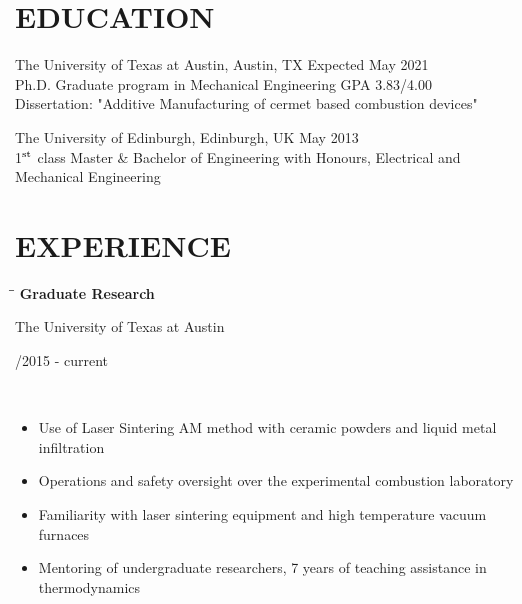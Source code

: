 \documentclass[11pt]{res}
\begin{document}
                                  
\begin{resume}

\vspace{-30pt}
\section{EDUCATION} 

\vspace{5pt}
	The University of Texas at Austin, Austin, TX \hfill Expected May 2021\\
	Ph.D. Graduate program in Mechanical Engineering \hfill GPA 3.83/4.00 \\[1pt]
	Dissertation: "Additive Manufacturing of cermet based combustion devices"
	
	The University of Edinburgh, Edinburgh, UK \hfill May 2013 \\        
	1$^\textnormal{st}$ class Master \& Bachelor of Engineering with Honours, Electrical and Mechanical Engineering   \\[1pt]

\vspace{-15pt}
\section{EXPERIENCE}
\vspace{-5pt}


   \begin{tabbing}
   \hspace{2.3in}\= \hspace{2.7in}\= \kill %
    {\bf Graduate Research} \> \parbox[c]{6cm}{ \centering The University of Texas at Austin }    \> \parbox[c]{3.3cm}{ /2015 - current} \\
   \end{tabbing}
   \vspace{-18pt}   %
	\begin{itemize}
	  \item Use of Laser Sintering AM method with ceramic powders and liquid metal infiltration
	  \item Operations and safety oversight over the experimental combustion laboratory
	  \item Familiarity with laser sintering equipment and high temperature vacuum furnaces
	  \item Mentoring of undergraduate researchers, 7 years of teaching assistance in  thermodynamics
	\end{itemize}
\vspace{-10pt}


\end{resume}
\end{document}
